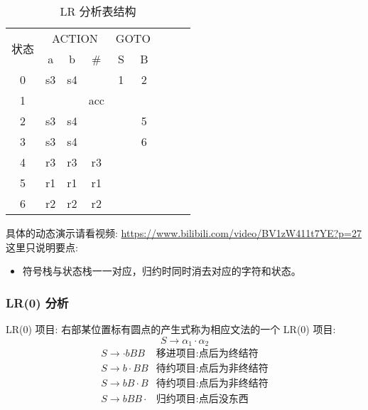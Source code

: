 \begin{table}[H]
    \centering
    \caption{LR 分析表结构}
    \label{table:LR 分析表结构}
    \setlength{\tabcolsep}{4mm}
    \begin{tabular}{|c|c|c|c|c|c|c|c|c|}
        \hline
        \multirow{2}{*}{状态} & \multicolumn{3}{c|}{ACTION} & \multicolumn{2}{c|}{GOTO}               \\ \cline{2-6}
                              & a                           & b                         & \#  & S & B \\ \hline
        0                     & s3                          & s4                        &     & 1 & 2 \\ \hline
        1                     &                             &                           & acc &   &   \\ \hline
        2                     & s3                          & s4                        &     &   & 5 \\ \hline
        3                     & s3                          & s4                        &     &   & 6 \\ \hline
        4                     & r3                          & r3                        & r3  &   &   \\ \hline
        5                     & r1                          & r1                        & r1  &   &   \\ \hline
        6                     & r2                          & r2                        & r2  &   &   \\
        \hline
    \end{tabular}
\end{table}

具体的动态演示请看视频: \url{https://www.bilibili.com/video/BV1zW411t7YE?p=27} 这里只说明要点:

\begin{itemize}
    \item 符号栈与状态栈一一对应，归约时同时消去对应的字符和状态。
\end{itemize}

\subsubsection{\textcolor{imp}{LR(0) 分析}}
LR(0) 项目: 右部某位置标有圆点的产生式称为相应文法的一个 LR(0) 项目:
\[S \rightarrow \alpha_1 \cdot \alpha_2\]
\begin{equation}
    \begin{aligned}
         & S \rightarrow \cdot bBB & \text{移进项目:点后为终结符}   &           \\
         & S \rightarrow b\cdot BB & \text{待约项目:点后为非终结符} &           \\
         & S \rightarrow bB\cdot B & \text{待约项目:点后为非终结符} &           \\
         & S \rightarrow bBB\cdot  & \text{归约项目:点后没东西}     & \nonumber
    \end{aligned}
\end{equation}

